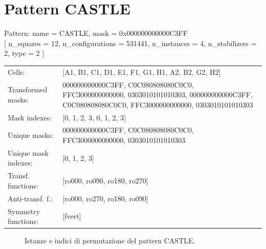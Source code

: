 \newpage

\section{Pattern CASTLE}

\begin{tcolorbox}[sharp corners, fontupper=\ttfamily\small, colback=white]
  \noindent Pattern: name = CASTLE, mask = 0x000000000000C3FF\\
  {[} n\_squares = 12, n\_configurations = 531441,
  n\_instances = 4, n\_stabilizers = 2, type = 2 { ]}\\[1.0ex]
  \begin{tabularx}{\textwidth}{@{} p{3.5cm} X @{}}
    Cells:               & {[}A1, B1, C1, D1, E1, F1, G1, H1, A2, B2, G2, H2{]}\\[0.5ex]
    Transformed masks:   & 000000000000C3FF, C0C080808080C0C0, FFC3000000000000, 0303010101010303, 000000000000C3FF, C0C080808080C0C0, FFC3000000000000, 0303010101010303\\[0.5ex]
    Mask indexes:        & {[}0, 1, 2, 3, 0, 1, 2, 3{]}\\[0.5ex]
    Unique masks:        & 000000000000C3FF, C0C080808080C0C0, FFC3000000000000, 0303010101010303\\[0.5ex]
    Unique mask indexes: & {[}0, 1, 2, 3{]}\\[0.5ex]
    Transf. functions:   & {[}ro000, ro090, ro180, ro270{]}\\[0.5ex]
    Anti-transf. f.:     & {[}ro000, ro270, ro180, ro090{]}\\[0.5ex]
    Symmetry functions:  & {[}fvert{]}\\[0.5ex]
  \end{tabularx}
\end{tcolorbox}

\begin{figure}[htbp]
  \centering
   \hfill
   \hfill
   \hfill
  \vspace{0.3cm}
   \hfill
   \hfill
   \hfill
  \caption{Istanze e indici di permutazione del pattern CASTLE.}
\end{figure}

